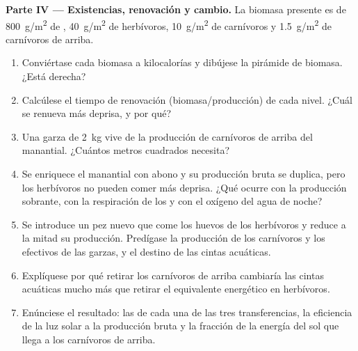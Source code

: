 \begin{problem}
\medskip
\noindent\textbf{Parte IV --- Existencias, renovación y cambio.}
La biomasa presente es de \qty{800}{g/m^2} de , \qty{40}{g/m^2}
de herbívoros, \qty{10}{g/m^2} de carnívoros y \qty{1.5}{g/m^2} de
carnívoros de arriba.
\begin{enumerate}[resume]
  \item Conviértase cada biomasa a kilocalorías y dibújese la pirámide de
        biomasa. ¿Está derecha?
  \item Calcúlese el tiempo de renovación (biomasa/producción) de cada
        nivel. ¿Cuál se renueva más deprisa, y por qué?
  \item Una garza de \qty{2}{kg} vive de la producción de carnívoros de
        arriba del manantial. ¿Cuántos metros cuadrados necesita?
  \item Se enriquece el manantial con abono y su producción bruta se
        duplica, pero los herbívoros no pueden comer más deprisa. ¿Qué
        ocurre con la producción sobrante, con la respiración de los
         y con el oxígeno del agua de noche?
  \item Se introduce un pez nuevo que come los huevos de los herbívoros y
        reduce a la mitad su producción. Predígase la producción de los
        carnívoros y los efectivos de las garzas, y el destino de las cintas
        acuáticas.
  \item Explíquese por qué retirar los carnívoros de arriba cambiaría las
        cintas acuáticas mucho más que retirar el equivalente energético en
        herbívoros.
  \item Enúnciese el resultado: las  de cada una de las
        tres transferencias, la eficiencia de la luz solar a la producción
        bruta y la fracción de la energía del sol que llega a los carnívoros
        de arriba.
\end{enumerate}
\end{problem}
